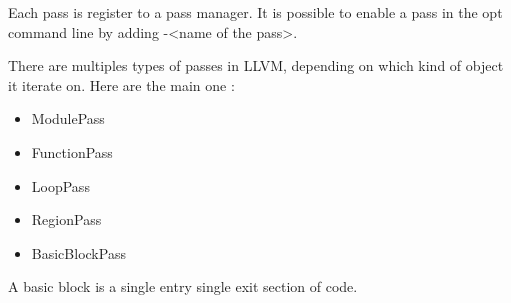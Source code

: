 Each pass is register to a pass manager. It is possible to enable a pass in the opt command line by adding -<name of the pass>. 

There are multiples types of passes in LLVM, depending on which kind of object it iterate on. Here are the main one :
\begin{itemize}
\item ModulePass
\item FunctionPass
\item LoopPass
\item RegionPass
\item BasicBlockPass
\end{itemize}
A basic block is a single entry single exit section of code.
